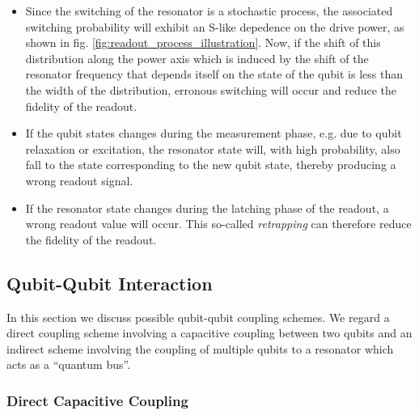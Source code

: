 \begin{itemize}
\item Since the switching of the resonator is a stochastic process, the associated switching probability will exhibit an S-like depedence on the drive power, as shown in fig. \ref{fig:readout_process_illustration}. Now, if the shift of this distribution along the power axis which is induced by the shift of the resonator frequency that depends itself on the state of the qubit is less than the width of the distribution, erronous switching will occur and reduce the fidelity of the readout.
\item If the qubit states changes during the measurement phase, e.g. due to qubit relaxation or excitation, the resonator state will, with high probability, also fall to the state corresponding to the new qubit state, thereby producing a wrong readout signal.
\item If the resonator state changes during the latching phase of the readout, a wrong readout value will occur. This so-called {\it retrapping} can therefore reduce the fidelity of the readout.
\end{itemize}

\subsection{Qubit-Qubit Interaction}

In this section we discuss possible qubit-qubit coupling schemes. We regard a direct coupling scheme involving a capacitive coupling between two qubits and an indirect scheme involving the coupling of multiple qubits to a resonator which acts as a ``quantum bus''.

\subsubsection{Direct Capacitive Coupling}

